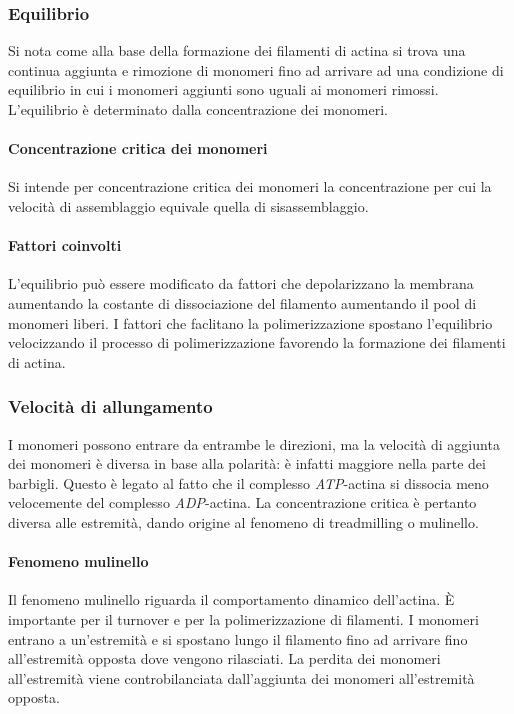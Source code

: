 		\subsubsection{Equilibrio}
		Si nota come alla base della formazione dei filamenti di actina si trova una continua aggiunta e rimozione di monomeri fino ad arrivare ad una condizione di equilibrio in cui i monomeri aggiunti sono uguali ai monomeri rimossi.
		L'equilibrio \`e determinato dalla concentrazione dei monomeri.
			
			\paragraph{Concentrazione critica dei monomeri}
			Si intende per concentrazione critica dei monomeri la concentrazione per cui la velocit\`a di assemblaggio equivale quella di sisassemblaggio.

			\paragraph{Fattori coinvolti}
			L'equilibrio pu\`o essere modificato da fattori che depolarizzano la membrana aumentando la costante di dissociazione del filamento aumentando il pool di monomeri liberi.
			I fattori che faclitano la polimerizzazione spostano l'equilibrio velocizzando il processo di polimerizzazione favorendo la formazione dei filamenti di actina.

		\subsubsection{Velocit\`a di allungamento}
		I monomeri possono entrare da entrambe le direzioni, ma la velocit\`a di aggiunta dei monomeri \`e diversa in base alla polarit\`a: \`e infatti maggiore nella parte dei barbigli.
		Questo \`e legato al fatto che il complesso \emph{ATP}-actina si dissocia meno velocemente del complesso \emph{ADP}-actina.
		La concentrazione critica \`e pertanto diversa alle estremit\`a, dando origine al fenomeno di treadmilling o mulinello.

			\paragraph{Fenomeno mulinello}
			Il fenomeno mulinello riguarda il comportamento dinamico dell'actina.
			\`E importante per il  turnover e per la polimerizzazione di filamenti.
			I monomeri entrano a un'estremit\`a e si spostano lungo il filamento fino ad arrivare fino all'estremit\`a opposta dove vengono rilasciati.
			La perdita dei monomeri all'estremit\`a viene controbilanciata dall'aggiunta dei monomeri all'estremit\`a opposta.

